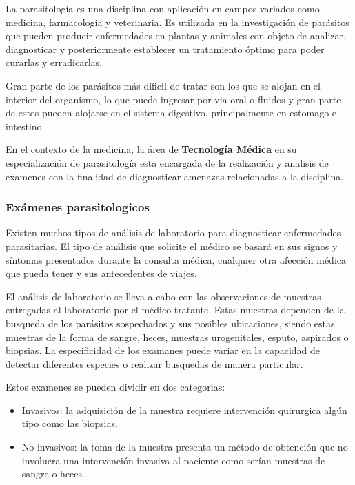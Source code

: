 \documentclass[letter,12pt]{report}
\begin{document}
La parasitología es una disciplina con aplicación en campos variados como medicina,
farmacologia y veterinaria. Es utilizada en la investigación de parásitos que pueden
producir enfermedades en plantas y animales con objeto de analizar, diagnosticar y
posteriormente establecer un tratamiento óptimo para poder curarlas y erradicarlas.

Gran parte de los parásitos más dificil de tratar son los que se alojan en el
interior del organismo, lo que puede ingresar por via oral o fluidos y gran parte de
estos pueden alojarse en el sistema digestivo, principalmente en estomago e
intestino.

En el contexto de la medicina, la área de \textbf{Tecnología Médica} en su
especialización de parasitología esta encargada de la realización y analisis de
examenes con la finalidad de diagnosticar amenazas relacionadas a la disciplina.

\subsubsection{Exámenes parasitologicos}

Existen muchos tipos de análisis de laboratorio para diagnosticar enfermedades parasitarias.
El tipo de análisis que solicite el médico se basará en sus signos y síntomas presentados
durante la consulta médica, cualquier otra afección médica que pueda tener y sus
antecedentes de viajes.

El análisis de laboratorio se lleva a cabo con las observaciones de muestras entregadas
al laboratorio por el médico tratante. Estas muestras dependen de la busqueda de los
parásitos sospechados y sus posibles ubicaciones, siendo estas muestras de la forma de
sangre, heces, muestras urogenitales, esputo, aspirados o biopsias. La especificidad de
los examanes puede variar en la capacidad de detectar diferentes especies o realizar
busquedas de manera particular.

Estos examenes se pueden dividir en dos categorias:

\begin{itemize}
    \item Invasivos: la adquisición de la muestra requiere intervención
        quirurgica algún tipo como las biopsias.
    \item No invasivos: la toma de la muestra presenta un método de obtención que no
        involucra una intervención invasiva al paciente como serían muestras de sangre o
        heces.
\end{itemize}
\end{document}
